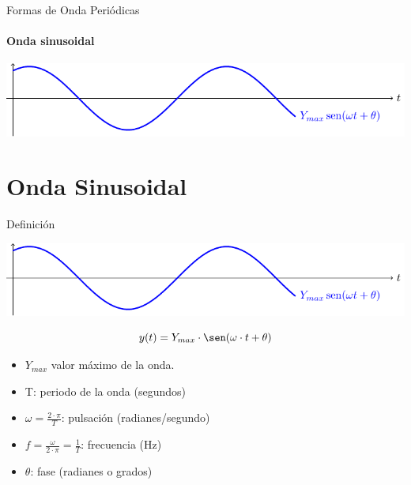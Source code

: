 \documentclass[aspectratio=169, usenames,svgnames,dvipsnames]{beamer}
\begin{document}
\begin{frame}[label={sec:orgbd21f4a}]{Formas de Onda Periódicas}
\framesubtitle{Onda sinusoidal}

\begin{center}
\includegraphics[width=.9\linewidth]{../figs/sin.pdf}
\end{center}
\end{frame}

\section{Onda Sinusoidal}
\label{sec:orgc8bd97e}

\begin{frame}[label={sec:orgaf4cd19}]{Definición}
\begin{center}
\includegraphics[width=.9\linewidth]{../figs/sin.pdf}
\end{center}


\[
y(t)=Y_{max}\cdot\sen(\omega\cdot t+\theta)
\]

\begin{itemize}
\item \(Y_{max}\) valor máximo de la onda.

\item T: periodo de la onda (segundos)

\item \(\omega=\frac{2\cdot\pi}{T}\): pulsación (radianes/segundo)

\item \(f=\frac{\omega}{2\cdot\pi}=\frac{1}{T}\): frecuencia (Hz)

\item \(\theta\): fase (radianes o grados)
\end{itemize}
\end{frame}
\end{document}
